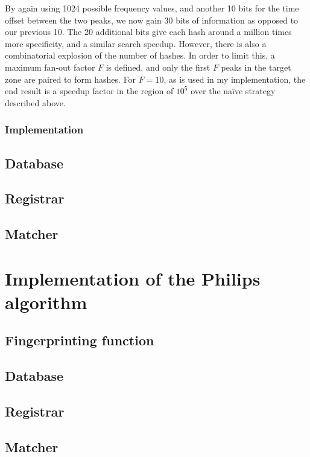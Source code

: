 \documentclass[12pt,a4paper,twoside,openright]{report}
\begin{document}
By again using 1024 possible frequency values, and another 10 bits for the time offset between the two peaks, we now gain 30 bits of information as opposed to our previous 10. The 20 additional bits give each hash around a million times more specificity, and a similar search speedup. However, there is also a combinatorial explosion of the number of hashes. In order to limit this, a maximum fan-out factor $F$ is defined, and only the first $F$ peaks in the target zone are paired to form hashes. For $F=10$, as is used in my implementation, the end result is a speedup factor in the region of $10^5$ over the na{\"i}ve strategy described above.

\subsubsection{Implementation}


\subsection{Database}
\subsection{Registrar}
\subsection{Matcher}
\label{shazam:matcher}




\section{Implementation of the Philips algorithm}
\label{section:philips}

\subsection{Fingerprinting function}
\subsection{Database}
\subsection{Registrar}
\subsection{Matcher}
\end{document}
